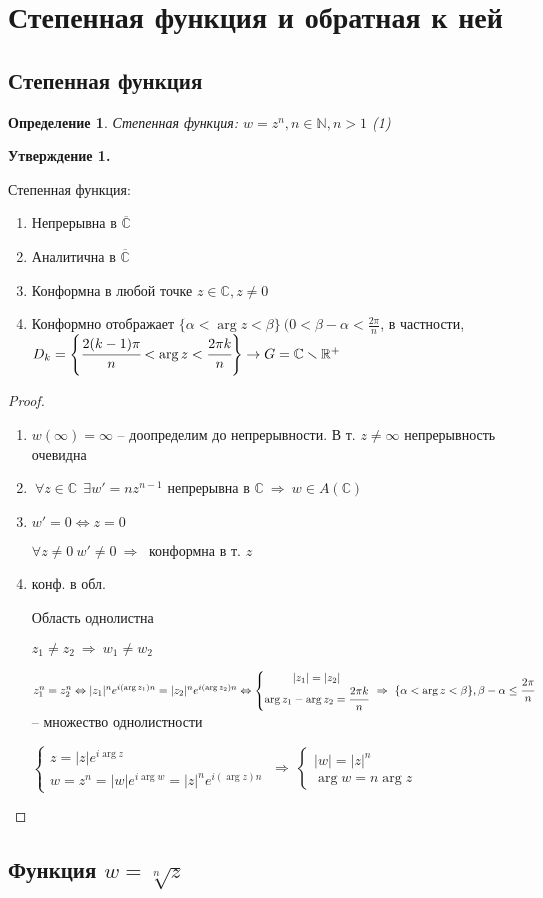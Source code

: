 \documentclass[draft]{report}
\newcommand{\forcenewline}{$\phantom{\mbox{newline}}$\newline}
\newcommand{\then}{\ \Rightarrow\ }
\newcommand{\R}{\mathbb{R}}
\renewcommand{\C}{\mathbb{C}}
\newcommand{\N}{\mathbb{N}}
\newcommand{\LRA}{\Leftrightarrow}
\renewcommand{\bar}{\overline}
\renewcommand{\a}{\alpha}
\renewcommand{\b}{\beta}
\newcommand{\E}{\ \exists}
\newcommand{\F}{\ \forall}
\newcommand{\CC}{\bar{\C}}
\newcommand{\sys}[1]{\left\{\begin{matrix}#1\end{matrix}\right.}
\newcommand{\opr}[1]{\begin{opred}#1\end{opred}}
\newtheorem*{opred}{Определение}
\theoremstyle{remark}
\begin{document}
\section{Степенная функция и обратная к ней}

\subsection{Степенная функция}

\opr{Степенная функция: $w=z^n, n\in \N, n>1$ (1)}
{\bfseries Утверждение 1.}

Степенная функция:
\begin{enumerate}
\item Непрерывна в $\CC$
\item Аналитична в $\CC$
\item Конформна в любой точке $z\in\C,z\neq0$
\item Конформно отображает $\{\a<\arg z<\b\}\ (0<\b-\a<\frac{2\pi}{n}$, в частности, $D_k=\left\{\cfrac{2(k-1)\pi}{n}<\arg z<\cfrac{2\pi k}{n}\right\}\to G=\C\smallsetminus\R^+$
\end{enumerate}
\begin{proof}
\forcenewline
\begin{enumerate}
\item $w(\infty)=\infty$ -- доопределим до непрерывности. В т. $z\neq\infty$ непрерывность очевидна
\item $\F z\in\C\ \E w'=nz^{n-1}$ непрерывна в $\C\then w\in A(\C)$
\item $w'=0\LRA z=0$

$\forall z\neq0\ w'\neq0\then$ конформна в т. $z$
\item конф. в обл.

Область однолистна

$z_1\neq z_2\then w_1\neq w_2$

$z_1^n=z_2^n\LRA |z_1|^ne^{i(\arg z_1)n}=|z_2|^ne^{i(\arg z_2)n}\LRA\sys{|z_1|=|z_2| \\ \arg z_1-\arg z_2=\cfrac{2\pi k}{n}}\then \{\a<\arg z<\b\}, \b-\a\leq \cfrac{2\pi}{n}$ -- множество однолистности

$\sys{z=|z|e^{i\arg z}\\w=z^n=|w|e^{i\arg w}=|z|^ne^{i(\arg z)n}}\then\sys{|w|=|z|^n \\ \arg w=n\arg z}$
\end{enumerate}
\end{proof}

\subsection{Функция $w=\sqrt[n]{z}$}
\end{document}
